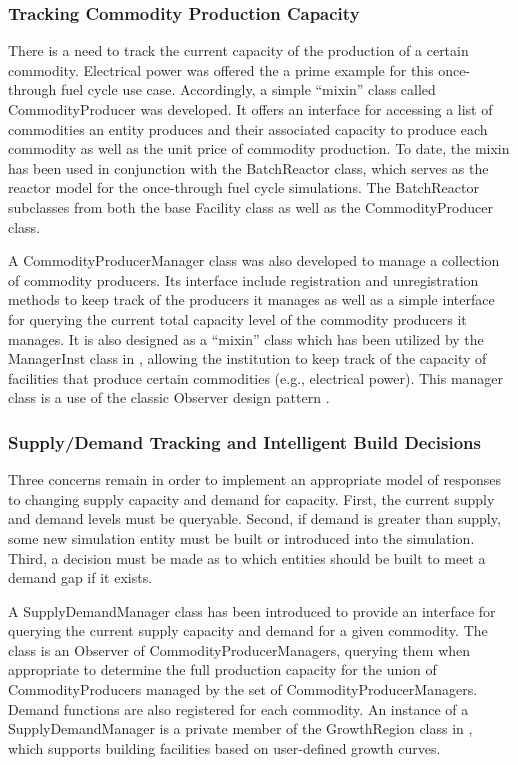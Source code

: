 \subsubsection{Tracking Commodity Production Capacity}

There is a need to track the current capacity of the production of a certain
commodity. Electrical power was offered the a prime example for this
once-through fuel cycle use case. Accordingly, a simple ``mixin'' class
\cite{ulrich_mixin-based_2001} called CommodityProducer was developed. It offers
an interface for accessing a list of commodities an entity produces and their
associated capacity to produce each commodity as well as the unit price of
commodity production. To date, the mixin has been used in conjunction with the
BatchReactor class, which serves as the reactor model for the once-through fuel
cycle simulations. The BatchReactor subclasses from both the base Facility class
as well as the CommodityProducer class.

A CommodityProducerManager class was also developed to manage a collection of
commodity producers. Its interface include registration and unregistration
methods to keep track of the producers it manages as well as a simple interface
for querying the current total capacity level of the commodity producers it
manages. It is also designed as a ``mixin'' class which has been utilized by the
ManagerInst class in \Cycamore, allowing the institution to keep track of the
capacity of facilities that produce certain commodities (e.g., electrical
power). This manager class is a use of the classic Observer design pattern
\cite{vlissides_design_1995}.

\subsubsection{Supply/Demand Tracking and Intelligent Build Decisions}

Three concerns remain in order to implement an appropriate model of responses to
changing supply capacity and demand for capacity. First, the current supply and
demand levels must be queryable. Second, if demand is greater than supply, some
new simulation entity must be built or introduced into the simulation. Third, a
decision must be made as to which entities should be built to meet a demand gap
if it exists.

A SupplyDemandManager class has been introduced to provide an interface for
querying the current supply capacity and demand for a given commodity. The class
is an Observer of CommodityProducerManagers, querying them when appropriate to
determine the full production capacity for the union of CommodityProducers
managed by the set of CommodityProducerManagers. Demand functions are also
registered for each commodity. An instance of a SupplyDemandManager is a private
member of the GrowthRegion class in \Cycamore, which supports building
facilities based on user-defined growth curves.

